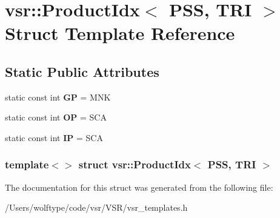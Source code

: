 \hypertarget{structvsr_1_1_product_idx_3_01_p_s_s_00_01_t_r_i_01_4}{\section{vsr\-:\-:Product\-Idx$<$ P\-S\-S, T\-R\-I $>$ Struct Template Reference}
\label{structvsr_1_1_product_idx_3_01_p_s_s_00_01_t_r_i_01_4}
}
\subsection*{Static Public Attributes}
\begin{DoxyCompactItemize}
\item 
\hypertarget{structvsr_1_1_product_idx_3_01_p_s_s_00_01_t_r_i_01_4_a452496b33a3f354caa98fbc7f4aa66ef}{static const int {\bfseries G\-P} = M\-N\-K}\label{structvsr_1_1_product_idx_3_01_p_s_s_00_01_t_r_i_01_4_a452496b33a3f354caa98fbc7f4aa66ef}

\item 
\hypertarget{structvsr_1_1_product_idx_3_01_p_s_s_00_01_t_r_i_01_4_ad5caecd8f5aa59065645a0f84b650a93}{static const int {\bfseries O\-P} = S\-C\-A}\label{structvsr_1_1_product_idx_3_01_p_s_s_00_01_t_r_i_01_4_ad5caecd8f5aa59065645a0f84b650a93}

\item 
\hypertarget{structvsr_1_1_product_idx_3_01_p_s_s_00_01_t_r_i_01_4_ad03e5a96de6f8ccca6baf2b3c69f5b9e}{static const int {\bfseries I\-P} = S\-C\-A}\label{structvsr_1_1_product_idx_3_01_p_s_s_00_01_t_r_i_01_4_ad03e5a96de6f8ccca6baf2b3c69f5b9e}

\end{DoxyCompactItemize}
\subsubsection*{template$<$$>$ struct vsr\-::\-Product\-Idx$<$ P\-S\-S, T\-R\-I $>$}



The documentation for this struct was generated from the following file\-:\begin{DoxyCompactItemize}
\item 
/\-Users/wolftype/code/vsr/\-V\-S\-R/vsr\-\_\-templates.\-h\end{DoxyCompactItemize}
